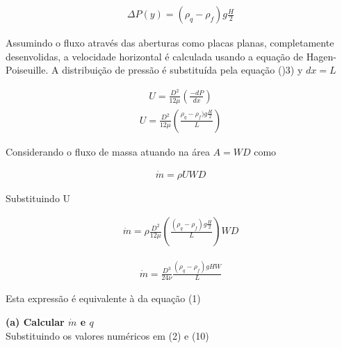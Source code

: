 \documentclass[12pt]{article}
\begin{document}
\begin{equation}
	\begin{aligned}
		\Delta P(y) = ( \rho _{q} - \rho _{f})g\frac{H}{2}
	\end{aligned}
\end{equation}

Assumindo o fluxo através das aberturas como placas planas, completamente desenvolidas, a velocidade horizontal é calculada usando a equação de Hagen-Poiseuille. A distribuição de pressão é substituída pela equação ()3) y $dx = L$


\begin{equation}
	\begin{aligned}
		U = \frac{D^{2}}{12\mu} \left( \frac{-dP}{dx}\right) 
	\end{aligned}
\end{equation}
\begin{equation}
	\begin{aligned}
		U = \frac{D^{2}}{12\mu} \left( \frac{\rho _{q} - \rho _{f})g\frac{H}{2}}{L}\right) 
	\end{aligned}
\end{equation}

Considerando o fluxo de massa atuando na área $A = WD$ como

\begin{equation}
	\begin{aligned}
		\dot{m} = \rho U WD
	\end{aligned}
\end{equation}

Substituindo U

\begin{equation}
	\begin{aligned}
		\dot{m} = \rho \frac{D^{2}}{12\mu} \left( \frac{(\rho _{q} - \rho _{f})g\frac{H}{2}}{L}\right)  WD
	\end{aligned}
\end{equation}

\begin{equation}
	\begin{aligned}
		\dot{m} = \frac{D^{3}}{24\nu} \frac{(\rho _{q} - \rho _{f})gHW}{L}
	\end{aligned}
\end{equation}

Esta expressão é equivalente à da equação (1)

\textbf{(a) Calcular $\dot{m}$ e $q$}\\

Substituindo os valores numéricos em (2) e (10)
\end{document}
